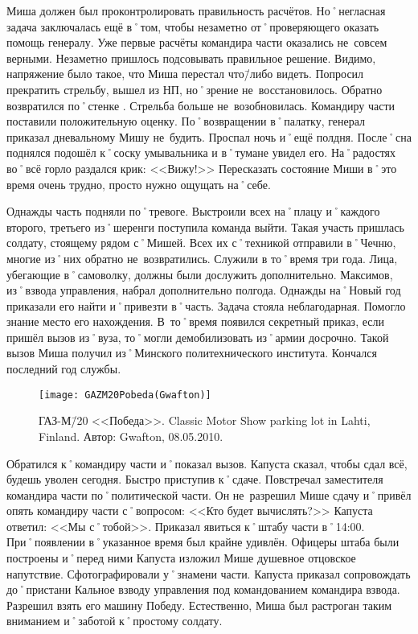 Миша должен был проконтролировать правильность расчётов. Но˚негласная задача заключалась ещё в˚том, чтобы незаметно от˚проверяющего оказать помощь генералу. Уже первые расчёты командира части оказались не~совсем верными. Незаметно пришлось подсовывать правильное решение. Видимо, напряжение было такое, что Миша перестал что\=/либо видеть. Попросил прекратить стрельбу, вышел из НП, но˚зрение не~восстановилось. Обратно возвратился по˚стенке . Стрельба больше не~возобновилась. Командиру части поставили положительную оценку. По˚возвращении в˚палатку, генерал приказал дневальному Мишу не~будить. Проспал ночь и˚ещё полдня. После˚сна поднялся подошёл к˚соску умывальника и в˚тумане увидел его. На˚радостях во˚всё горло раздался крик: <<Вижу!>> Пересказать состояние Миши в˚это время очень трудно, просто нужно ощущать на˚себе.

Однажды часть подняли по˚тревоге. Выстроили всех на˚плацу и˚каждого второго, третьего из˚шеренги поступила команда выйти. Такая участь пришлась солдату, стоящему рядом с˚Мишей. Всех их с˚техникой отправили в˚Чечню, многие из˚них обратно не~возвратились. Служили в то˚время три года. Лица, убегающие в˚самоволку, должны были дослужить дополнительно. Максимов, из˚взвода управления, набрал дополнительно полгода. Однажды на˚Новый год приказали его найти и˚привезти в˚часть. Задача стояла неблагодарная. Помогло знание место его нахождения. В~то˚время появился секретный приказ, если пришёл вызов из˚вуза, то˚могли демобилизовать из˚армии досрочно. Такой вызов Миша получил из˚Минского политехнического института. Кончался последний год службы.

\begin{wrapfigure}{O}{.4\textwidth}
\centering
\texttt{[image: GAZM20Pobeda(Gwafton)]}
\caption{ГАЗ-М\=/20 <<Победа>>. Classic Motor Show parking lot in Lahti, Finland. Автор: Gwafton, 08.05.2010.}
\label{fig:GAZM20Pobeda(Gwafton)}
\end{wrapfigure}

Обратился к˚командиру части и˚показал вызов. Капуста сказал, чтобы сдал всё, будешь уволен сегодня. Быстро приступив к˚сдаче. Повстречал заместителя командира части по˚политической части. Он не~разрешил Мише сдачу и˚привёл опять командиру части с˚вопросом: <<Кто будет вычислять?>> Капуста ответил: <<Мы с˚тобой>>. Приказал явиться к˚штабу части в˚14:00. При˚появлении в˚указанное время был крайне удивлён. Офицеры штаба были построены и˚перед ними Капуста изложил Мише душевное отцовское напутствие. Сфотографировали у˚знамени части. Капуста приказал сопровождать до˚пристани Кальное взводу управления под командованием командира взвода. Разрешил взять его машину Победу. Естественно, Миша был растроган таким вниманием и˚заботой к˚простому солдату. 

